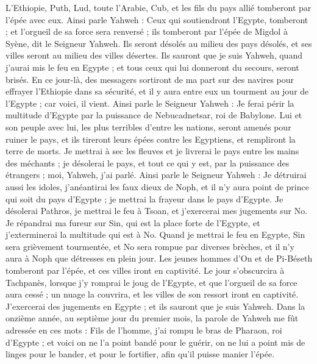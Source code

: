\begin{multicols}{2}
L'Ethiopie, Puth, Lud, toute l'Arabie, Cub, et les fils du pays allié tomberont par l'épée avec eux.
Ainsi parle Yahweh : Ceux qui soutiendront l'Egypte, tomberont ; et l'orgueil de sa force sera renversé ; ils tomberont par l'épée de Migdol à Syène, dit le Seigneur Yahweh.
Ils seront désolés au milieu des pays désolés, et ses villes seront au milieu des villes désertes.
Ils sauront que je suis Yahweh, quand j'aurai mis le feu en Egypte ; et tous ceux qui lui donneront du secours, seront brisés.
En ce jour-là, des messagers sortiront de ma part sur des navires pour effrayer l'Ethiopie dans sa sécurité, et il y aura entre eux un tourment au jour de l'Egypte ; car voici, il vient.
Ainsi parle le Seigneur Yahweh : Je ferai périr la multitude d'Egypte par la puissance de Nebucadnetsar, roi de Babylone.
Lui et son peuple avec lui, les plus terribles d'entre les nations, seront amenés pour ruiner le pays, et ils tireront leurs épées contre les Egyptiens, et rempliront la terre de morts.
Je mettrai à sec les fleuves et je livrerai le pays entre les mains des méchants ; je désolerai le pays, et tout ce qui y est, par la puissance des étrangers ; moi, Yahweh, j'ai parlé.
Ainsi parle le Seigneur Yahweh : Je détruirai aussi les idoles, j'anéantirai les faux dieux de Noph, et il n'y aura point de prince qui soit du pays d'Egypte ; je mettrai la frayeur dans le pays d'Egypte.
Je désolerai Pathros, je mettrai le feu à Tsoan, et j'exercerai mes jugements sur No.
Je répandrai ma fureur sur Sin, qui est la place forte de l'Egypte, et j'exterminerai la multitude qui est à No.
Quand je mettrai le feu en Egypte, Sin sera grièvement tourmentée, et No sera rompue par diverses brèches, et il n'y aura à Noph que détresses en plein jour.
Les jeunes hommes d'On et de Pi-Béseth tomberont par l'épée, et ces villes iront en captivité.
Le jour s'obscurcira à Tachpanès, lorsque j'y romprai le joug de l'Egypte, et que l'orgueil de sa force aura cessé ; un nuage la couvrira, et les villes de son ressort iront en captivité.
J'exercerai des jugements en Egypte ; et ils sauront que je suis Yahweh.
Dans la onzième année, au septième jour du premier mois, la parole de Yahweh me fût adressée en ces mots :
Fils de l'homme, j'ai rompu le bras de Pharaon, roi d'Egypte ; et voici on ne l'a point bandé pour le guérir, on ne lui a point mis de linges pour le bander, et pour le fortifier, afin qu'il puisse manier l'épée.

\end{multicols}
